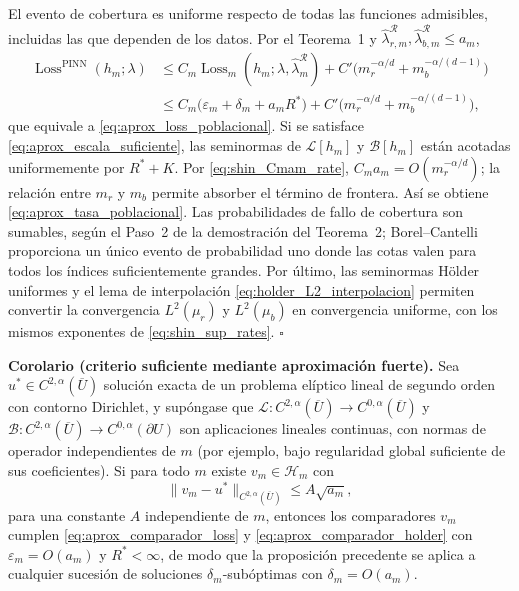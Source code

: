 El evento de cobertura es uniforme respecto de todas las funciones
admisibles, incluidas las que dependen de los datos. Por el Teorema~1 y
$\widehat\lambda_{r,m}^{\mathcal R},
\widehat\lambda_{b,m}^{\mathcal R}\leq a_m$,
\begin{align*}
\operatorname{Loss}^{\mathrm{PINN}}(h_m;\lambda)
&\leq C_m\operatorname{Loss}_m
 (h_m;\lambda,\widehat\lambda_m^{\mathcal R})
 +C'\bigl(m_r^{-\alpha/d}+m_b^{-\alpha/(d-1)}\bigr)\\
&\leq C_m\bigl(\varepsilon_m+\delta_m+a_mR^*\bigr)
 +C'\bigl(m_r^{-\alpha/d}+m_b^{-\alpha/(d-1)}\bigr),
\end{align*}
que equivale a \eqref{eq:aprox_loss_poblacional}.
Si se satisface \eqref{eq:aprox_escala_suficiente}, las seminormas de
$\mathcal L[h_m]$ y $\mathcal B[h_m]$ están acotadas uniformemente por
$R^*+K$. Por \eqref{eq:shin_Cmam_rate},
$C_ma_m=O(m_r^{-\alpha/d})$; la relación entre $m_r$ y $m_b$
permite absorber el término de frontera. Así se obtiene
\eqref{eq:aprox_tasa_poblacional}. Las probabilidades de fallo de
cobertura son sumables, según el Paso~2 de la demostración del
Teorema~2; Borel--Cantelli proporciona un único evento de probabilidad
uno donde las cotas valen para todos los índices suficientemente grandes.
Por último, las seminormas Hölder uniformes y el lema de interpolación
\eqref{eq:holder_L2_interpolacion} permiten convertir la convergencia
$L^2(\mu_r)$ y $L^2(\mu_b)$ en convergencia uniforme, con los mismos
exponentes de \eqref{eq:shin_sup_rates}. \hfill$\square$

\medskip
\noindent\textbf{Corolario (criterio suficiente mediante aproximación fuerte).}
Sea $u^*\in C^{2,\alpha}(\overline U)$ solución exacta de un problema
elíptico lineal de segundo orden con contorno Dirichlet, y supóngase que
$\mathcal L:C^{2,\alpha}(\overline U)\to C^{0,\alpha}(\overline U)$
y $\mathcal B:C^{2,\alpha}(\overline U)\to C^{0,\alpha}(\partial U)$
son aplicaciones lineales continuas, con normas de operador
independientes de $m$ (por ejemplo, bajo regularidad global suficiente
de sus coeficientes). Si para todo $m$ existe $v_m\in\mathcal H_m$
con
\begin{equation}\label{eq:aprox_criterio_fuerte}
\|v_m-u^*\|_{C^{2,\alpha}(\overline U)}
\leq A\sqrt{a_m},
\end{equation}
para una constante $A$ independiente de $m$, entonces los
comparadores $v_m$ cumplen
\eqref{eq:aprox_comparador_loss} y
\eqref{eq:aprox_comparador_holder} con
$\varepsilon_m=O(a_m)$ y $R^*<\infty$, de modo que la proposición
precedente se aplica a cualquier sucesión de soluciones
$\delta_m$-subóptimas con $\delta_m=O(a_m)$.

